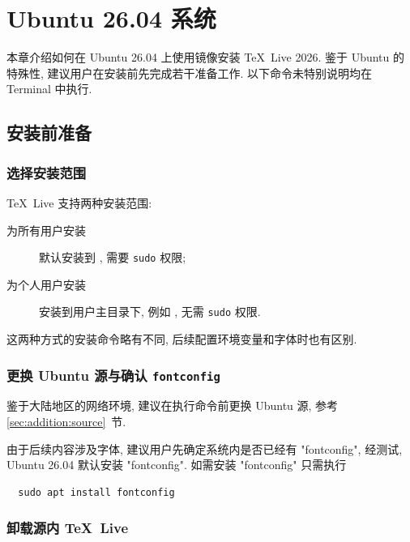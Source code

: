 
\chapter{Ubuntu 26.04 系统}

本章介绍如何在 Ubuntu 26.04 上使用镜像安装 \TeX~Live 2026.
鉴于 Ubuntu 的特殊性,
建议用户在安装前先完成若干准备工作.
以下命令未特别说明均在 \textsf{Terminal} 中执行.

\section{安装前准备}\label{sec:ubuntu:prepare}

\subsection{选择安装范围}

\TeX~Live 支持两种安装范围:
\begin{description}
  \item[为所有用户安装] 默认安装到 ,
  需要 \texttt{sudo} 权限;
  \item[为个人用户安装] 安装到用户主目录下,
  例如 ,
  无需  \texttt{sudo} 权限.
\end{description}
这两种方式的安装命令略有不同,
后续配置环境变量和字体时也有区别.

\subsection{更换 Ubuntu 源与确认 \texttt{fontconfig}}

鉴于大陆地区的网络环境,
建议在执行命令前更换 Ubuntu 源,
参考 \ref{sec:addition:source}~节.

由于后续内容涉及字体,
建议用户先确定系统内是否已经有 "fontconfig",
经测试,
Ubuntu 26.04 默认安装 "fontconfig".
如需安装 "fontconfig" 只需执行
\begin{lstlisting}
  sudo apt install fontconfig
\end{lstlisting}

\subsection{卸载源内 \TeX~Live}\label{sec:ubuntu:aptremove}

